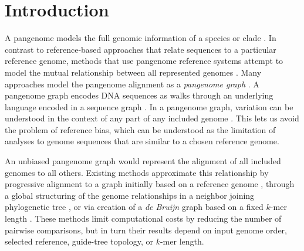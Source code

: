 \documentclass{bioinfo}
\theoremstyle{definition}
\begin{document}
\maketitle


\section{Introduction}
\label{sec:introduction}
A pangenome models the full genomic information of a species or clade \citep{Medini_2005,Sherman_2020,Garrison_2019_thesis}.
In contrast to reference-based approaches that relate sequences to a particular reference genome, methods that use pangenome reference systems attempt to model the mutual relationship between all represented genomes \citep{cpang2018}.
Many approaches model the pangenome alignment as a \textit{pangenome graph} \citep{Garrison_2018,Yokoyama2019,Hickey:2020}.
A pangenome graph encodes DNA sequences as walks through an underlying language encoded in a sequence graph \citep{Hein_1989}.
In a pangenome graph, variation can be understood in the context of any part of any included genome  \citep{Eizenga_2020}.
This lets us avoid the problem of reference bias, which can be understood as the limitation of analyses to genome sequences that are similar to a chosen reference genome.

An unbiased pangenome graph would represent the alignment of all included genomes to all others.
Existing methods approximate this relationship by progressive alignment to a graph initially based on a reference genome \citep{Li:2020}, through a global structuring of the genome relationships in a neighbor joining phylogenetic tree \citep{Armstrong:2020}, or via creation of a \textit{de Bruijn} graph based on a fixed $k$-mer length \citep{Minkin_2016,Sheikhizadeh_2016,Yu_2021}.
These methods limit computational costs by reducing the number of pairwise comparisons, but in turn their results depend on input genome order, selected reference, guide-tree topology, or $k$-mer length.
\end{document}

